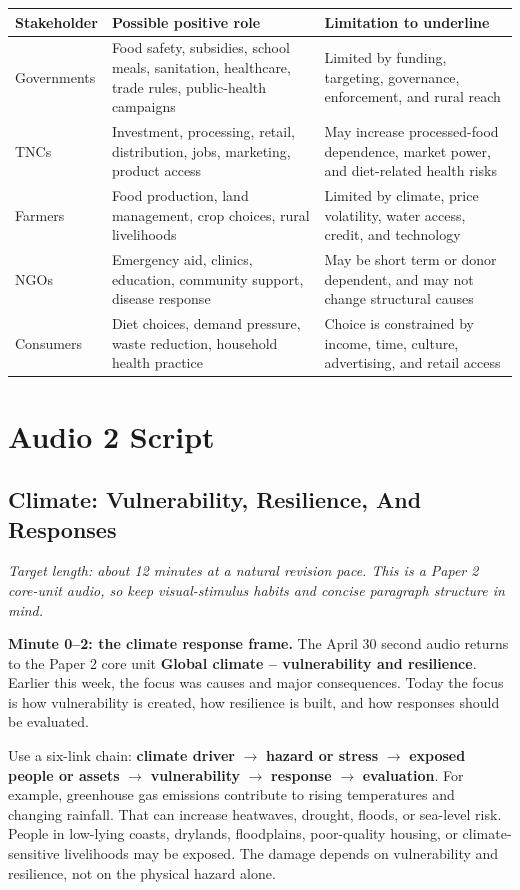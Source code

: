 \documentclass[11pt,a4paper]{article}
\newcommand{\term}[1]{\textcolor{HeadingBlue}{\textbf{#1}}}
\begin{document}
\begin{tabularx}{\textwidth}{L{0.18\textwidth}Y Y}
\toprule
\textbf{Stakeholder} & \textbf{Possible positive role} & \textbf{Limitation to underline} \\
\midrule
Governments & Food safety, subsidies, school meals, sanitation, healthcare,
trade rules, public-health campaigns & Limited by funding, targeting,
governance, enforcement, and rural reach \\
TNCs & Investment, processing, retail, distribution, jobs, marketing, product
access & May increase processed-food dependence, market power, and diet-related
health risks \\
Farmers & Food production, land management, crop choices, rural livelihoods &
Limited by climate, price volatility, water access, credit, and technology \\
NGOs & Emergency aid, clinics, education, community support, disease response &
May be short term or donor dependent, and may not change structural causes \\
Consumers & Diet choices, demand pressure, waste reduction, household health
practice & Choice is constrained by income, time, culture, advertising, and
retail access \\
\bottomrule
\end{tabularx}

\section{Audio 2 Script}

\subsection{Climate: Vulnerability, Resilience, And Responses}

\textit{Target length: about 12 minutes at a natural revision pace. This is a
Paper 2 core-unit audio, so keep visual-stimulus habits and concise paragraph
structure in mind.}

\textbf{Minute 0--2: the climate response frame.}
The April 30 second audio returns to the Paper 2 core unit \term{Global climate
-- vulnerability and resilience}. Earlier this week, the focus was causes and
major consequences. Today the focus is how vulnerability is created, how
resilience is built, and how responses should be evaluated.

Use a six-link chain: \term{climate driver} $\rightarrow$ \term{hazard or
stress} $\rightarrow$ \term{exposed people or assets} $\rightarrow$
\term{vulnerability} $\rightarrow$ \term{response} $\rightarrow$
\term{evaluation}. For example, greenhouse gas emissions contribute to rising
temperatures and changing rainfall. That can increase heatwaves, drought,
floods, or sea-level risk. People in low-lying coasts, drylands, floodplains,
poor-quality housing, or climate-sensitive livelihoods may be exposed. The
damage depends on vulnerability and resilience, not on the physical hazard
alone.
\end{document}
